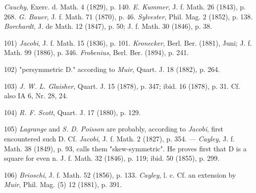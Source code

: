 \vspace{-0.1cm}
\leftline{\rule{2in}{0.4pt}}
\vspace{0.1cm}
{
\footnotesize
\textit{Cauchy}, Exerc. d. Math. 4 (1829), p. 140. \textit{E. Kummer}, J. f. Math. 26 (1843), p. 268. \textit{G. Bauer}, J. f. Math. 71 (1870), p. 46. \textit{Sylvester}, Phil. Mag. 2 (1852), p. 138. \textit{Borchardt}, J. de Math. 12 (1847), p. 50; J. f. Math. 30 (1846), p. 38.

101) \textit{Jacobi}, J. f. Math. 15 (1836), p. 101. \textit{Kronecker}, Berl. Ber. (1881), Juni; J. f. Math. 99 (1886), p. 346. \textit{Frobenius}, Berl. Ber. (1894), p. 241.

102) "persymmetric D." according to \textit{Muir}, Quart. J. 18 (1882), p. 264.

103) \textit{J. W. L. Glaisher}, Quart. J. 15 (1878), p. 347; ibid. 16 (1878), p. 31. Cf. also IA 6, Nr. 28, 24.

104) \textit{R. F. Scott}, Quart. J. 17 (1880), p. 129.

105) \textit{Lagrange} and \textit{S. D. Poisson} are probably, according to \textit{Jacobi}, first encountered such D. Cf. \textit{Jacobi}, J. f. Math. 2 (1827), p. 354. — \textit{Cayley}, J. f. Math. 38 (1849), p. 93, calls them "skew-symmetric". He proves first that D is a square for even n. J. f. Math. 32 (1846), p. 119; ibid. 50 (1855), p. 299.

106) \textit{Brioschi}, J. f. Math. 52 (1856), p. 133. \textit{Cayley}, l. c. Cf. an extension by \textit{Muir}, Phil. Mag. (5) 12 (1881), p. 391.

}
